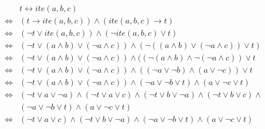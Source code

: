 \documentclass[a4,abstract=on]{scrartcl}
\begin{document}
\begin{align*}
\begin{aligned}
&t \leftrightarrow ite(a,b,c)\\
\Leftrightarrow& (t \rightarrow ite (a,b,c)) \wedge (ite (a,b,c) \rightarrow t)\\
\Leftrightarrow& (\neg t \vee ite(a,b,c)) \wedge (\neg ite(a,b,c) \vee t)\\
\Leftrightarrow& (\neg t \vee (a \wedge b) \vee (\neg a \wedge c)) \wedge (\neg((a \wedge b) \vee (\neg a \wedge c)) \vee t)\\
\Leftrightarrow& (\neg t \vee (a \wedge b) \vee (\neg a \wedge c)) \wedge ((\neg(a \wedge b) \wedge \neg (\neg a \wedge c)) \vee t\\
\Leftrightarrow& (\neg t \vee (a \wedge b) \vee (\neg a \wedge c)) \wedge ((\neg a \vee \neg b) \wedge (a \vee \neg c)) \vee t\\
\Leftrightarrow& (\neg t \vee (a \wedge b) \vee (\neg a \wedge c)) \wedge (\neg a \vee \neg b \vee t) \wedge (a \vee \neg c \vee t)\\
\Leftrightarrow& (\neg t \vee a \vee \neg a) \wedge (\neg t \vee a\vee c) \wedge (\neg t \vee b \vee \neg a) \wedge (\neg t \vee b \vee c) \wedge \\
& (\neg a \vee \neg b \vee t) \wedge (a \vee \neg c \vee t)\\
\Leftrightarrow &(\neg t \vee a\vee c) \wedge (\neg t \vee b \vee \neg a) \wedge (\neg a \vee \neg b \vee t) \wedge (a \vee \neg c \vee t)
\end{aligned}
\end{align*}

\end{document}
